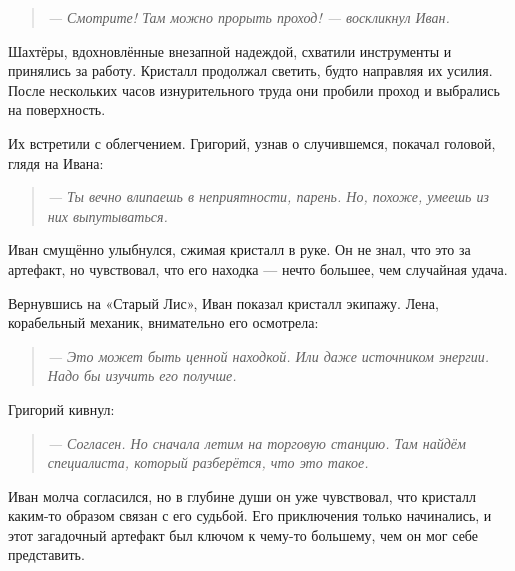 \documentclass[12pt,a4paper]{book}
\newenvironment{dialogue}{\begin{quote}\itshape}{\end{quote}}
\begin{document}
\begin{dialogue}
--- Смотрите! Там можно прорыть проход! --- воскликнул Иван.
\end{dialogue}

Шахтёры, вдохновлённые внезапной надеждой, схватили инструменты и принялись за работу. Кристалл продолжал светить, будто направляя их усилия. После нескольких часов изнурительного труда они пробили проход и выбрались на поверхность.

Их встретили с облегчением. Григорий, узнав о случившемся, покачал головой, глядя на Ивана:

\begin{dialogue}
--- Ты вечно влипаешь в неприятности, парень. Но, похоже, умеешь из них выпутываться.
\end{dialogue}

Иван смущённо улыбнулся, сжимая кристалл в руке. Он не знал, что это за артефакт, но чувствовал, что его находка --- нечто большее, чем случайная удача.

Вернувшись на «Старый Лис», Иван показал кристалл экипажу. Лена, корабельный механик, внимательно его осмотрела:

\begin{dialogue}
--- Это может быть ценной находкой. Или даже источником энергии. Надо бы изучить его получше.
\end{dialogue}

Григорий кивнул:

\begin{dialogue}
--- Согласен. Но сначала летим на торговую станцию. Там найдём специалиста, который разберётся, что это такое.
\end{dialogue}

Иван молча согласился, но в глубине души он уже чувствовал, что кристалл каким-то образом связан с его судьбой. Его приключения только начинались, и этот загадочный артефакт был ключом к чему-то большему, чем он мог себе представить.
\end{document}
